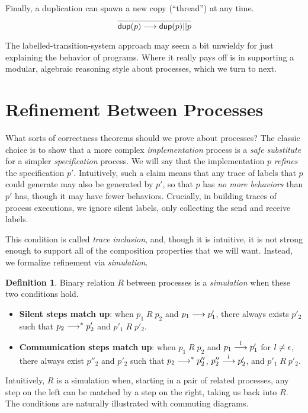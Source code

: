 \documentclass{amsbook}
\theoremstyle{definition}
\newtheorem{definition}[theorem]{Definition}
\theoremstyle{remark}
\numberwithin{section}{chapter}
\numberwithin{equation}{chapter}
\begin{document}
Finally, a duplication can spawn a new copy (``thread'') at any time.
$$\infer{\lts{\dup{p}}{}{\parl{\dup{p}}{p}}}{}$$

The labelled-transition-system approach may seem a bit unwieldy for just explaining the behavior of programs.
Where it really pays off is in supporting a modular, algebraic reasoning style about processes, which we turn to next.


\section{Refinement Between Processes}

What sorts of correctness theorems should we prove about processes?
The classic choice is to show that a more complex \emph{implementation} process is a \emph{safe substitute} for a simpler \emph{specification} process.
We will say that the implementation $p$ \emph{refines} the specification $p'$.
Intuitively, such a claim means that any trace of labels that $p$ could generate may also be generated by $p'$, so that $p$ has \emph{no more behaviors} than $p'$ has, though it may have fewer behaviors.
Crucially, in building traces of process executions, we ignore silent labels, only collecting the send and receive labels.

This condition is called \emph{trace inclusion}, and, though it is intuitive, it is not strong enough to support all of the composition properties that we will want.
Instead, we formalize refinement via \emph{simulation}.

\begin{definition}
  Binary relation $R$ between processes is a \emph{simulation} when these two conditions hold.
  \begin{itemize}
  \item \textbf{Silent steps match up}: when $p_1 \; R \; p_2$ and $p_1 \stackrel{}{\longrightarrow} p'_1$, there always exists $p'_2$ such that $p_2 \stackrel{}{\longrightarrow}^* p'_2$ and $p'_1 \; R \; p'_2$.
  \item \textbf{Communication steps match up}: when $p_1 \; R \; p_2$ and $p_1 \stackrel{l}{\longrightarrow} p'_1$ for $l \neq \epsilon$, there always exist $p''_2$ and $p'_2$ such that $p_2 \stackrel{}{\longrightarrow}^* p''_2$, $p''_2 \stackrel{l}{\longrightarrow} p'_2$, and $p'_1 \; R \; p'_2$.
  \end{itemize}
\end{definition}

Intuitively, $R$ is a simulation when, starting in a pair of related processes, any step on the left can be matched by a step on the right, taking us back into $R$.
The conditions are naturally illustrated with commuting diagrams.
\end{document}
